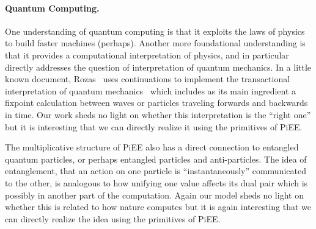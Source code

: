 \documentclass[preprint]{sigplanconf}
\begin{document}

\paragraph*{Quantum Computing.} 
One understanding of quantum computing is that it exploits the laws of physics
to build faster machines (perhaps). Another more foundational understanding
is that it provides a computational interpretation of physics, and in
particular directly addresses the question of interpretation of quantum
mechanics. In a little known document, Rozas~\cite{Rozas:1987:CMO:889539}
uses continuations to implement the transactional interpretation of quantum
mechanics~\cite{transactional} which includes as its main ingredient a
fixpoint calculation between waves or particles traveling forwards and
backwards in time. Our work sheds no light on whether this interpretation is
the ``right one'' but it is interesting that we can directly realize it using
the primitives of {{PiEE}}. 


The multiplicative structure of {{PiEE}} also has a direct
connection to entangled quantum particles, or perhaps entangled
particles and anti-particles.  The idea of entanglement, that an
action on one particle is ``instantaneously'' communicated to the
other, is analogous to how unifying one value affects its dual pair
which is possibly in another part of the computation.  Again our model
sheds no light on whether this is related to how nature computes but
it is again interesting that we can directly realize the idea using
the primitives of {{PiEE}}.
\end{document}
